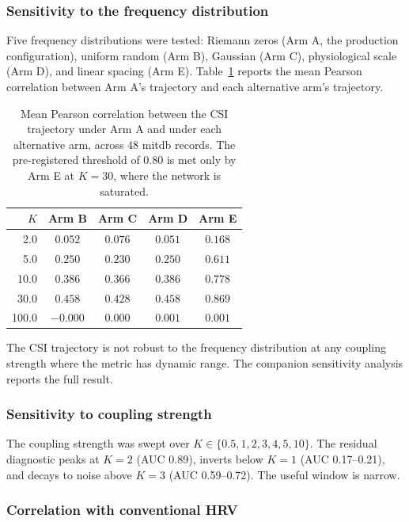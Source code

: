 \documentclass[11pt]{article}
\begin{document}
\subsubsection{Sensitivity to the frequency distribution}

Five frequency distributions were tested: Riemann zeros (Arm A, the
production configuration), uniform random (Arm B), Gaussian (Arm C),
physiological scale (Arm D), and linear spacing (Arm E). Table~\ref{tab:trajectory-wp}
reports the mean Pearson correlation between Arm A's trajectory and
each alternative arm's trajectory.

\begin{table}[h]
\centering
\begin{tabular}{r|cccc}
\toprule
$K$ & Arm B & Arm C & Arm D & Arm E \\
\midrule
2.0 & $0.052$ & $0.076$ & $0.051$ & $0.168$ \\
5.0 & $0.250$ & $0.230$ & $0.250$ & $0.611$ \\
10.0 & $0.386$ & $0.366$ & $0.386$ & $0.778$ \\
30.0 & $0.458$ & $0.428$ & $0.458$ & $\mathbf{0.869}$ \\
100.0 & $-0.000$ & $0.000$ & $0.001$ & $0.001$ \\
\bottomrule
\end{tabular}
\caption{Mean Pearson correlation between the CSI trajectory under Arm
A and under each alternative arm, across 48 mitdb records. The
pre-registered threshold of $0.80$ is met only by Arm E at $K = 30$,
where the network is saturated.}
\label{tab:trajectory-wp}
\end{table}

The CSI trajectory is not robust to the frequency distribution at any
coupling strength where the metric has dynamic range. The companion
sensitivity analysis reports the full result.

\subsubsection{Sensitivity to coupling strength}

The coupling strength was swept over $K \in \{0.5, 1, 2, 3, 4, 5, 10\}$.
The residual diagnostic peaks at $K = 2$ (AUC 0.89), inverts below
$K = 1$ (AUC 0.17--0.21), and decays to noise above $K = 3$
(AUC 0.59--0.72). The useful window is narrow.

\subsubsection{Correlation with conventional HRV}
\end{document}
